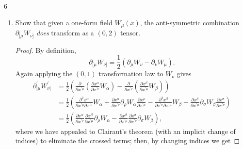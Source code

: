 \documentclass[11pt]{article}
\begin{document}
\begin{problem}{6}
\begin{enumerate}[label=(\alph*)]
\begin{proof}
		      \end{proof}
		      However, there are a few exceptions.
		\item Show that given a one-form field \( W_{\mu}(x) \), the anti-symmetric combination \(\partial_{[\mu}W_{\nu]}\) \textit{does} transform as a \( (0,2) \) tensor.
		      \begin{proof}
			      By definition,
			      \begin{equation}
				      \label{eq:28}
				      \partial_{[\mu}W_{\nu]} = \frac{1}{2} \left( \partial_{\mu}W_{\nu} - \partial_{\nu}W_{\mu} \right).
			      \end{equation}
			      Again applying the \( (0,1) \) transformation law to \( W_{\nu} \) gives
			      \begin{equation}
				      \label{eq:29}
				      \begin{aligned}
					      \partial^{\prime}_{[\mu}W^{\prime}_{\nu]} & = \frac{1}{2} \left( \frac{\partial }{\partial x^{\prime\mu}} (\frac{\partial x^{\alpha}}{\partial x^{\prime\nu}} W_{\alpha} ) - \frac{\partial }{\partial x^{\prime\nu}} (\frac{\partial x^{\beta}}{\partial x^{\prime\mu}} W_{\beta}) \right)                                                                                                                                                                                                                              \\[.5em]
					                                                & = \frac{1}{2} \left( \frac{\partial^2 x^{\alpha}}{\partial x^{\prime\mu} \partial x^{\prime\nu}} W_{\alpha} + \frac{\partial x^{\alpha}}{\partial x^{\prime\nu}} \partial_{\rho}W_{\alpha} \frac{\partial x^{\rho}}{\partial x^{\prime\mu}} - \frac{\partial^2 x^{\beta}}{\partial x^{\prime\nu} \partial x^{\prime\mu}} W_{\beta} - \frac{\partial x^{\beta}}{\partial x^{\prime\mu}} \partial_{\sigma}W_{\beta} \frac{\partial x^{\sigma}}{\partial x^{\prime\nu}} \right) \\[.5em]
					                                                & = \frac{1}{2} \left( \frac{\partial x^{\alpha}}{\partial x^{\prime\nu}} \frac{\partial x^{\beta}}{\partial x^{\prime\mu}} \partial_{\rho}W_{\alpha} - \frac{\partial x^{\beta}}{\partial x^{\prime\mu}} \frac{\partial x^{\sigma}}{\partial x^{\prime\nu}} \partial_{\sigma}W_{\beta} \right),
				      \end{aligned}
			      \end{equation}
			      where we have appealed to Clairaut's theorem (with an implicit change of indices) to eliminate the crossed terms; then, by changing indices we get

\end{proof}
\end{enumerate}
\end{problem}
\end{document}
